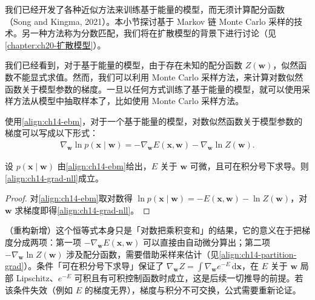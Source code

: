 \documentclass[../../main.tex]{subfiles}
\begin{document}
我们已经开发了各种近似方法来训练基于能量的模型，而无须计算配分函数（Song and Kingma, 2021）。本小节探讨基于 Markov 链 Monte Carlo 采样的技术。另一种方法称为分数匹配，我们将在扩散模型的背景下进行讨论（见\cref{chapter:ch20-扩散模型}）。

我们已经看到，对于基于能量的模型，由于存在未知的配分函数 $Z(\bm{w})$，似然函数不能显式求值。然而，我们可以利用 Monte Carlo 采样方法，来计算对数似然函数关于模型参数的梯度。一旦以任何方式训练了基于能量的模型，就可以使用采样方法从模型中抽取样本了，比如使用 Monte Carlo 采样方法。

使用\eqref{align:ch14-ebm}，对于一个基于能量的模型，对数似然函数关于模型参数的梯度可以写成以下形式：
\begin{align}
\nabla_{\bm{w}}\ln p(\bm{x}\mid\bm{w})=-\nabla_{\bm{w}}E(\bm{x},\bm{w})-\nabla_{\bm{w}}\ln Z(\bm{w}).
\label{align:ch14-grad-nll}
\end{align}

\begin{proposition}[对数似然的梯度]\label{proposition:ch14-对数似然梯度}
设 $p(\bm{x}\mid\bm{w})$ 由\eqref{align:ch14-ebm}给出，$E$ 关于 $\bm{w}$ 可微，且可在积分号下求导。则\eqref{align:ch14-grad-nll}成立。
\end{proposition}

\begin{proof}
对\eqref{align:ch14-ebm}取对数得 $\ln p(\bm{x}\mid\bm{w})=-E(\bm{x},\bm{w})-\ln Z(\bm{w})$，对 $\bm{w}$ 求梯度即得\eqref{align:ch14-grad-nll}。
\end{proof}

\begin{remark}（重构新增）这个恒等式本身只是「对数把乘积变和」的结果，它的意义在于把梯度分成两项：第一项 $-\nabla_{\bm{w}}E(\bm{x},\bm{w})$ 可以直接由自动微分算出；第二项 $-\nabla_{\bm{w}}\ln Z(\bm{w})$ 涉及配分函数，需要借助采样来估计（见\eqref{align:ch14-partition-grad}）。条件「可在积分号下求导」保证了 $\nabla_{\bm{w}}Z=\int\nabla_{\bm{w}}e^{-E}\,\mathrm{d}\bm{x}$，在 $E$ 关于 $\bm{w}$ 局部 Lipschitz、$e^{-E}$ 可积且有可积控制函数时成立，这是后续一切推导的前提。若该条件失效（例如 $E$ 的梯度无界），梯度与积分不可交换，公式需要重新论证。
\end{remark}
\end{document}

